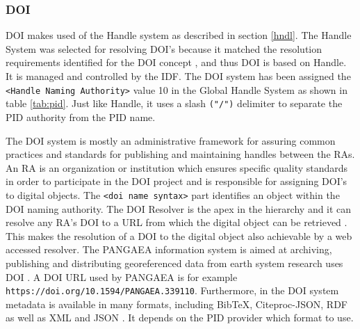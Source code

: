 \subsubsection{DOI}\label{doi}
DOI makes used of the Handle system as described in section \ref{hndl}. The Handle System was selected for resolving DOI's because it matched the resolution requirements identified for the DOI concept \cite{doi-found}, and thus DOI is based on Handle. It is managed and controlled by the IDF. The DOI system has been assigned the \texttt{<Handle Naming Authority>} value 10 in the Global Handle System as shown in table \ref{tab:pid}. Just like Handle, it uses a slash \texttt{("/")} delimiter to separate the PID authority from the PID name.

The DOI system is mostly an administrative framework for assuring common practices and standards for publishing and maintaining handles between the RAs. An RA is an organization or institution which ensures specific quality standards in order to participate in the DOI project and is responsible for assigning DOI's to digital objects. The \texttt{<doi name syntax>} part identifies an object within the DOI naming authority. The DOI Resolver is the apex in the hierarchy and it can resolve any RA's DOI to a URL from which the digital object can be retrieved \cite{icn-bd}. This makes the resolution of a DOI to the digital object also achievable by a web accessed resolver. The PANGAEA information system is aimed at archiving, publishing and distributing georeferenced data from earth system research uses DOI \cite{pang}. A DOI URL used by PANGAEA is for example \texttt{https://doi.org/10.1594/PANGAEA.339110}.
Furthermore, in the DOI system metadata is available in many formats, including BibTeX, Citeproc-JSON, RDF as well as XML and JSON \cite{doi-met}. It depends on the PID provider which format to use.


